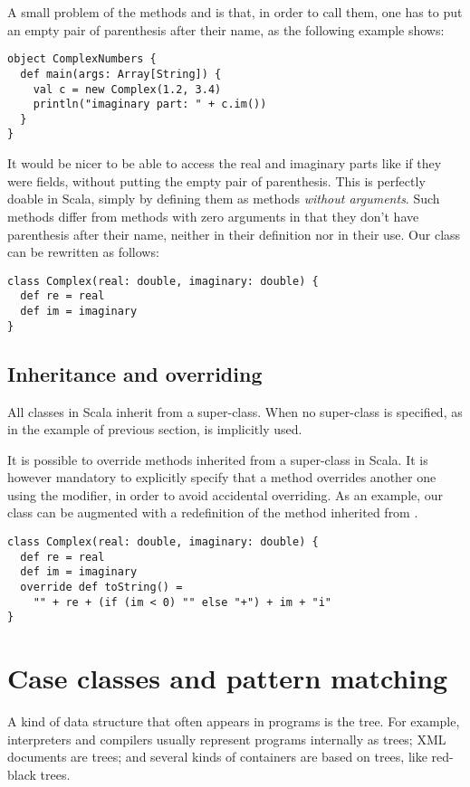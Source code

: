 \documentclass[a4paper,12pt,twoside,titlepage]{article}
\newcommand{\langname}[1]{#1\xspace}
\newcommand{\Scala}{\langname{Scala}}
\begin{document}
A small problem of the methods  and  is that, in
order to call them, one has to put an empty pair of parenthesis after
their name, as the following example shows:
\begin{lstlisting}[escapechar=\#]
object ComplexNumbers {
  def main(args: Array[String]) {
    val c = new Complex(1.2, 3.4)
    println("imaginary part: " + c.im())
  }
}
\end{lstlisting}
It would be nicer to be able to access the real and imaginary parts
like if they were fields, without putting the empty pair of
parenthesis. This is perfectly doable in \Scala, simply by defining
them as methods \emph{without arguments}. Such methods differ from
methods with zero arguments in that they don't have parenthesis after
their name, neither in their definition nor in their use. Our
 class can be rewritten as follows:
\begin{lstlisting}
class Complex(real: double, imaginary: double) {
  def re = real
  def im = imaginary
}
\end{lstlisting}

\subsection{Inheritance and overriding}
\label{sec:inheritance}

All classes in \Scala inherit from a super-class. When no super-class
is specified, as in the  example of previous section,
 is implicitly used.

It is possible to override methods inherited from a super-class in
\Scala. It is however mandatory to explicitly specify that a method
overrides another one using the  modifier, in order to
avoid accidental overriding. As an example, our  class
can be augmented with a redefinition of the  method
inherited from .
\begin{lstlisting}
class Complex(real: double, imaginary: double) {
  def re = real
  def im = imaginary
  override def toString() =
    "" + re + (if (im < 0) "" else "+") + im + "i"
}
\end{lstlisting}

\section{Case classes and pattern matching}
\label{sec:case-classes-pattern}

A kind of data structure that often appears in programs is the tree.
For example, interpreters and compilers usually represent programs
internally as trees; XML documents are trees; and several kinds of
containers are based on trees, like red-black trees.
\end{document}
